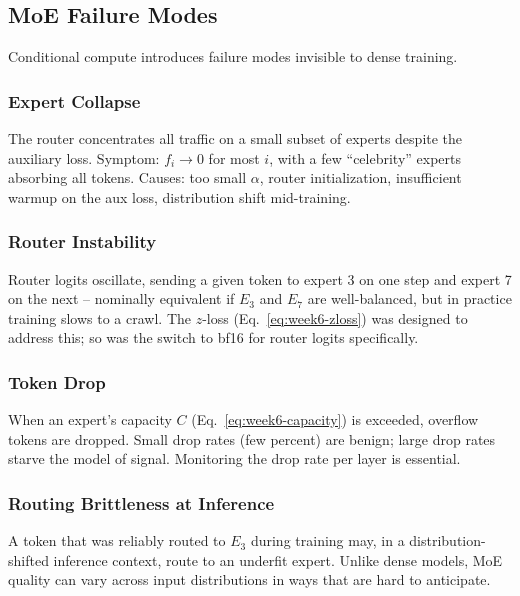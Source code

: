 \subsection{MoE Failure Modes}

Conditional compute introduces failure modes invisible to dense
training.

\subsubsection{Expert Collapse}

The router concentrates all traffic on a small subset of experts
despite the auxiliary loss. Symptom: $f_i \to 0$ for most $i$, with a
few ``celebrity'' experts absorbing all tokens. Causes: too small
$\alpha$, router initialization, insufficient warmup on the aux loss,
distribution shift mid-training.

\subsubsection{Router Instability}

Router logits oscillate, sending a given token to expert 3 on one
step and expert 7 on the next -- nominally equivalent if $E_3$ and
$E_7$ are well-balanced, but in practice training slows to a crawl.
The $z$-loss (Eq.\ \eqref{eq:week6-zloss}) was designed to address
this; so was the switch to bf16 for router logits specifically.

\subsubsection{Token Drop}

When an expert's capacity $C$ (Eq.\ \eqref{eq:week6-capacity}) is
exceeded, overflow tokens are dropped. Small drop rates (few percent)
are benign; large drop rates starve the model of signal. Monitoring
the drop rate per layer is essential.

\subsubsection{Routing Brittleness at Inference}

A token that was reliably routed to $E_3$ during training may, in a
distribution-shifted inference context, route to an underfit expert.
Unlike dense models, MoE quality can vary across input distributions
in ways that are hard to anticipate.

